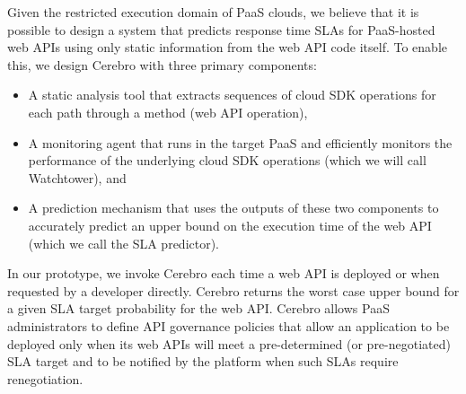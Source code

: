 Given the restricted execution domain of PaaS clouds, we believe that it is possible
to design a system that predicts response time SLAs for PaaS-hosted web APIs using only
static information from the web API code itself.  To enable this, we design Cerebro
with three primary components:
\begin{itemize}
\item A static analysis tool that extracts sequences of cloud SDK operations for 
each path through a method (web API operation),
\item A monitoring agent that runs in the target PaaS and efficiently monitors 
the performance of the underlying cloud SDK operations (which we will call Watchtower), and
\item A prediction mechanism that uses the outputs of these two components to accurately predict an upper bound on the execution time of the web API (which we call the SLA predictor).
\end{itemize}
In our prototype, we invoke Cerebro each time a web API is deployed or when requested
by a developer directly. Cerebro returns the worst case upper bound for a 
given SLA target probability for the web API.  
Cerebro allows PaaS administrators to define API governance policies that 
allow an application to be deployed only when its web APIs will meet a 
pre-determined (or pre-negotiated) SLA target and to be notified 
by the platform when such SLAs require renegotiation.




